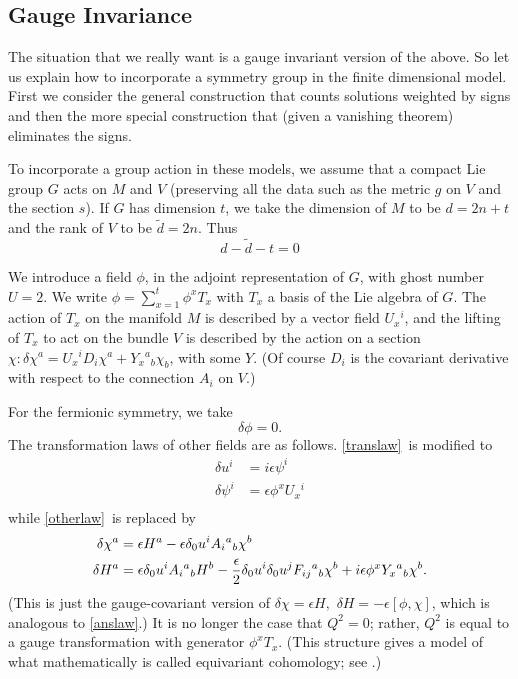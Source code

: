 \documentclass[12pt]{article}
\numberwithin{equation}{section}
\def\tilde{\widetilde}
\begin{document}
\subsection{Gauge Invariance}

The situation that we really want is a gauge invariant
version of the above.  So let us explain how to incorporate
a symmetry group in the finite dimensional model.  First we consider
the general construction that counts solutions weighted by signs
and then the more special construction that (given a vanishing theorem)
eliminates the signs.

To incorporate a group action in these models, we assume
that a compact Lie group $G$ acts on $M$ and $V$ (preserving all the data
such as the metric $g$ on $V$ and the section $s$).
If $G$ has dimension $t$, we take the dimension of
$M$ to be $d=2n+t$ and the rank of $V$ to be $\tilde d=2n$.
Thus
\begin{equation}
  \label{dimcond}
  d-\tilde d - t= 0
\end{equation}

We introduce a field $\phi$, in the adjoint representation
of $G$, with ghost number $U=2$.  We write $\phi=\sum_{x=1}^t \phi^xT_x$
with $T_x$ a basis of the Lie algebra of $G$.
The action of $T_x$ on the manifold $M$ is described by a vector field
$U_x{}^i$, and the lifting of $T_x$ to act on the bundle $V$
is described by the action on a section $\chi: \delta \chi^a=U_x{}^iD_i
\chi^a+Y_x{}^a{}_b\chi_b$, with some $Y$. (Of course $D_i$ is the
covariant derivative with respect to the connection $A_i$ on $V$.)

For the fermionic symmetry, we take
\begin{equation}
  \label{deltaphi}
  \delta\phi = 0.
\end{equation}
The transformation laws of other fields are as follows.
\eqref{translaw}\ is modified to
\begin{equation}
  \label{anslaw}
  \begin{aligned} \delta u^i & = i\epsilon\psi^i \\ \delta\psi^i & =
    \epsilon \phi^x U_x{}^i \\
  \end{aligned}
\end{equation}
while \eqref{otherlaw}\ is replaced by
\begin{equation}
  \label{notherlaw}
  \begin{aligned}\delta \chi^a & =  \epsilon H^a-\epsilon \delta_0
    u^iA_i{}^a{}_b\chi^b\\ \delta H^a    & =\epsilon\delta_0 u^i
    A_i{}^a{}_bH^b -{\epsilon\over 2}\delta_0 u^i\delta_0 u^j
    F_{ij}{}^a{}_b \chi^b+i\epsilon \phi^x Y_x{}^a{}_b\chi^b. \\
  \end{aligned}
\end{equation}  (This is just the gauge-covariant version of
  $\delta\chi=\epsilon
H,\,\,\delta H=-\epsilon[\phi,\chi]$, which is analogous to \eqref{anslaw}.)
It is no longer the case that $Q^2=0$; rather, $Q^2$ is equal to a gauge
transformation with generator $\phi^xT_x$.  (This structure gives
  a model of what mathematically is called equivariant cohomology; see
\cite{mq,atj}.)
\end{document}
